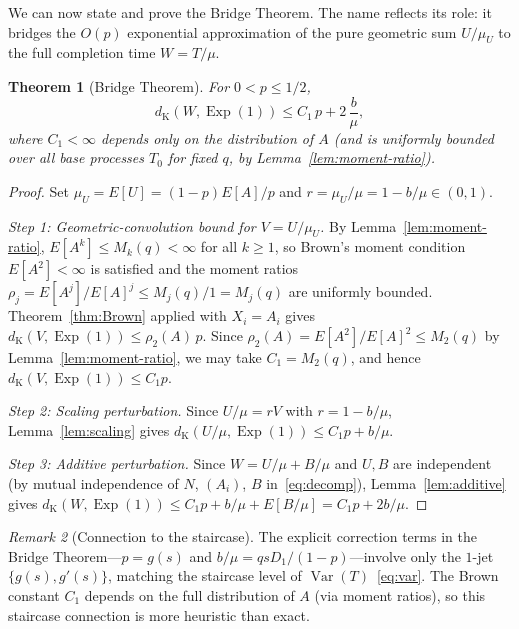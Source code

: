 \documentclass[11pt]{article}
\theoremstyle{plain}
\newtheorem{theorem}{Theorem}[section]
\theoremstyle{definition}
\theoremstyle{remark}
\newtheorem{remark}[theorem]{Remark}
\DeclareMathOperator{\Var}{Var}
\DeclareMathOperator{\Exp}{Exp}
\newcommand{\dK}{d_{\mathrm{K}}}
\begin{document}
We can now state and prove the Bridge Theorem.  The name reflects its role: it bridges the $O(p)$ exponential approximation of the pure geometric sum $U/\mu_U$ to the full completion time $W = T/\mu$.

\begin{theorem}[Bridge Theorem]\label{thm:bridge}
For $0 < p \leq 1/2$,
\begin{equation}\label{eq:bridge}
  \dK(W, \Exp(1)) \leq C_1\,p + 2\,\frac{b}{\mu},
\end{equation}
where $C_1 < \infty$ depends only on the distribution of $A$ (and is uniformly bounded over all base processes $T_0$ for fixed $q$, by Lemma~\ref{lem:moment-ratio}).
\end{theorem}

\begin{proof}
Set $\mu_U = E[U] = (1-p)E[A]/p$ and $r = \mu_U/\mu = 1 - b/\mu \in (0,1)$.


\emph{Step 1: Geometric-convolution bound for $V = U/\mu_U$.}\;
By Lemma~\ref{lem:moment-ratio}, $E[A^k] \leq M_k(q) < \infty$ for all $k \geq 1$, so Brown's moment condition $E[A^2] < \infty$ is satisfied and the moment ratios $\rho_j = E[A^j]/E[A]^j \leq M_j(q)/1 = M_j(q)$ are uniformly bounded.  Theorem~\ref{thm:Brown} applied with \(X_i=A_i\) gives $\dK(V,\Exp(1))\le \rho_2(A)\,p$. Since $\rho_2(A)=E[A^2]/E[A]^2\le M_2(q)$ by Lemma~\ref{lem:moment-ratio},
we may take $C_1=M_2(q)$, and hence 
$\dK(V,\Exp(1))\le C_1 p$. 




\emph{Step 2: Scaling perturbation.}\;
Since $U/\mu = rV$ with $r = 1 - b/\mu$, Lemma~\ref{lem:scaling} gives $\dK(U/\mu, \Exp(1)) \leq C_1 p + b/\mu$.

\emph{Step 3: Additive perturbation.}\;
Since $W = U/\mu + B/\mu$ and $U, B$ are independent (by mutual independence of $N$, $(A_i)$, $B$ in~\eqref{eq:decomp}), Lemma~\ref{lem:additive} gives $\dK(W, \Exp(1)) \leq C_1 p + b/\mu + E[B/\mu] = C_1 p + 2b/\mu$. %
\end{proof}








\begin{remark}[Connection to the staircase]\label{rem:bridge-staircase}
The explicit correction terms in the Bridge Theorem---$p = g(s)$ and $b/\mu = qsD_1/(1-p)$---involve only the $1$-jet $\{g(s), g'(s)\}$, matching the staircase level of $\Var(T)$~\eqref{eq:var}. The Brown constant $C_1$ depends on the full distribution of $A$ (via moment ratios), so this staircase connection is more heuristic than exact.
\end{remark}
\end{document}
